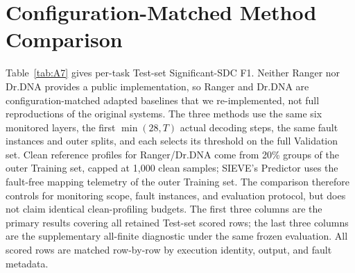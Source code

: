 \section{Configuration-Matched Method Comparison}
\label{app:method}

Table~\ref{tab:A7} gives per-task Test-set Significant-SDC F1. Neither Ranger nor Dr.DNA provides a public implementation, so Ranger and Dr.DNA are configuration-matched adapted baselines that we re-implemented, not full reproductions of the original systems. The three methods use the same six monitored layers, the first $\min(28,T)$ actual decoding steps, the same fault instances and outer splits, and each selects its threshold on the full Validation set. Clean reference profiles for Ranger/Dr.DNA come from 20\% groups of the outer Training set, capped at 1{,}000 clean samples; SIEVE's Predictor uses the fault-free mapping telemetry of the outer Training set. The comparison therefore controls for monitoring scope, fault instances, and evaluation protocol, but does not claim identical clean-profiling budgets. The first three columns are the primary results covering all retained Test-set scored rows; the last three columns are the supplementary all-finite diagnostic under the same frozen evaluation. All scored rows are matched row-by-row by execution identity, output, and fault metadata.

\begin{table}[!ht]
\caption{Configuration-matched per-task Significant-SDC F1 (\%).}
\label{tab:A7}
\centering
\small
{}
\end{table}


